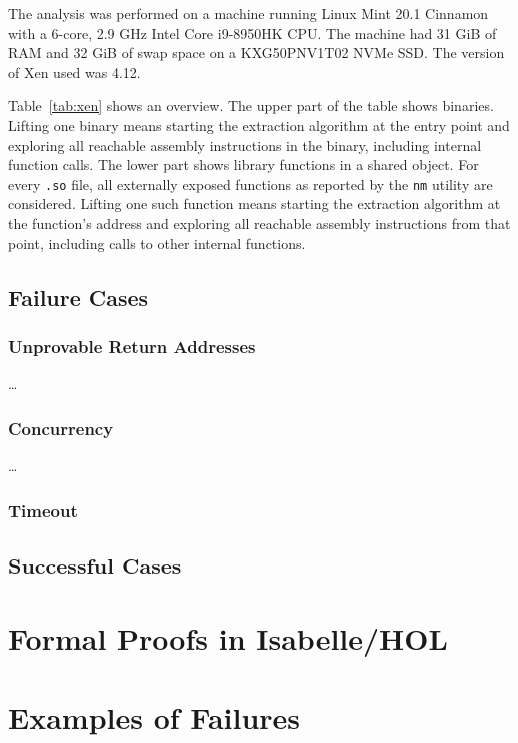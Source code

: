 The analysis was performed on a machine running Linux Mint 20.1 Cinnamon
with a 6-core, 2.9 GHz Intel Core i9-8950HK CPU.
The machine had 31 GiB of RAM
and 32 GiB of swap space on a KXG50PNV1T02 NVMe SSD.
The version of Xen used was 4.12.

Table~\ref{tab:xen} shows an overview.
The upper part of the table shows binaries.
Lifting one binary means starting the extraction algorithm at the entry point and exploring all reachable assembly instructions in the binary, including internal function calls.
The lower part shows library functions in a shared object.
For every \lstinline|.so| file, all externally exposed functions as reported by the \lstinline|nm| utility are considered.
Lifting one such function means starting the extraction algorithm at the function's address and exploring all reachable assembly instructions from that point, including calls to other internal functions.

\subsection{Failure Cases}

\subsubsection{Unprovable Return Addresses}
\todo\dots

\subsubsection{Concurrency}
\todo\dots

\subsubsection{Timeout}

\subsection{Successful Cases}

\section{Formal Proofs in Isabelle/HOL}

\section{Examples of Failures}
